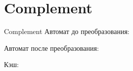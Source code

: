 \section{Complement}
\begin{frame}{Complement}
	Автомат до преобразования:


	Автомат после преобразования:


	Кэш:


\end{frame}

